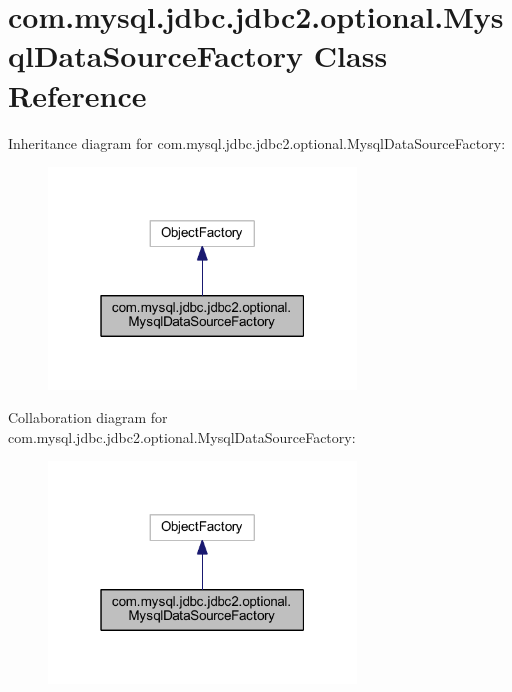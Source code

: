 \hypertarget{classcom_1_1mysql_1_1jdbc_1_1jdbc2_1_1optional_1_1_mysql_data_source_factory}{}\section{com.\+mysql.\+jdbc.\+jdbc2.\+optional.\+Mysql\+Data\+Source\+Factory Class Reference}
\label{classcom_1_1mysql_1_1jdbc_1_1jdbc2_1_1optional_1_1_mysql_data_source_factory}


Inheritance diagram for com.\+mysql.\+jdbc.\+jdbc2.\+optional.\+Mysql\+Data\+Source\+Factory\+:
\nopagebreak
\begin{figure}[H]
\begin{center}
\leavevmode
\includegraphics[width=232pt]{classcom_1_1mysql_1_1jdbc_1_1jdbc2_1_1optional_1_1_mysql_data_source_factory__inherit__graph}
\end{center}
\end{figure}


Collaboration diagram for com.\+mysql.\+jdbc.\+jdbc2.\+optional.\+Mysql\+Data\+Source\+Factory\+:
\nopagebreak
\begin{figure}[H]
\begin{center}
\leavevmode
\includegraphics[width=232pt]{classcom_1_1mysql_1_1jdbc_1_1jdbc2_1_1optional_1_1_mysql_data_source_factory__coll__graph}
\end{center}
\end{figure}
